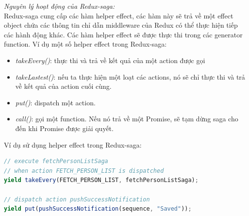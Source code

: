 \textit{Nguyên lý hoạt động của Redux-saga:} \\
Redux-saga cung cấp các hàm helper effect, các hàm này sẽ
trả về một effect object chứa các thông tin chỉ dẫn middleware
của Redux có thể thực hiện tiếp các hành động khác. Các hàm
helper effect sẽ được thực thi trong các generator function.
Ví dụ một số helper effect trong Redux-saga:
\begin{itemize}
\item \textit{takeEvery()}:
    thực thi và trả về kết quả của một action được gọi
\item \textit{takeLastest()}: nếu ta thực hiện một loạt các actions,
    nó sẽ chỉ thực thi và trả về kết quả của action cuối cùng.
\item \textit{put()}: dispatch một action.
\item \textit{call()}: gọi một function. Nếu nó trả về một Promise,
    sẽ tạm dừng saga cho đến khi Promise được giải quyết.
\end{itemize}
Ví dụ sử dụng helper effect trong Redux-saga:
\begin{lstlisting}[language=JavaScript,caption={Sử dụng Redux-Saga},captionpos=b]
// execute fetchPersonListSaga
// when action FETCH_PERSON_LIST is dispatched
yield takeEvery(FETCH_PERSON_LIST, fetchPersonListSaga);

// dispatch action pushSuccessNotification 
yield put(pushSuccessNotification(sequence, "Saved"));
\end{lstlisting}



